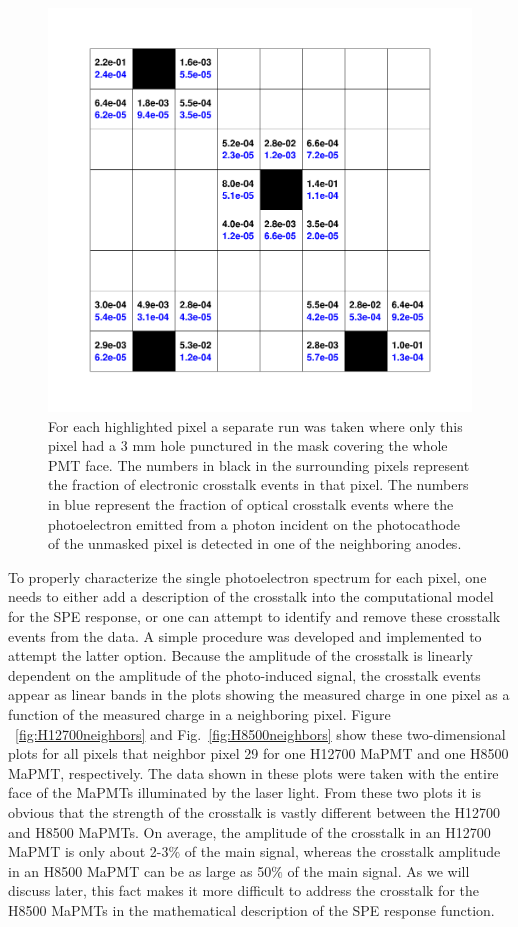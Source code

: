 \begin{figure}
	\centering
	\includegraphics[width=\linewidth]{figures/H12700_ct_ratio_updated.png}
	\caption{For each highlighted pixel a separate run was taken where only this pixel had a 3 mm hole punctured in the mask covering the whole PMT face. The numbers in black in the surrounding pixels represent the fraction of electronic crosstalk events in that pixel. The numbers in blue represent the fraction of optical crosstalk events where the photoelectron emitted from a photon incident on the photocathode of the unmasked pixel is detected in one of the neighboring anodes.}
	\label{fig:H12700_ct_ratio}
\end{figure}

To properly characterize the single photoelectron spectrum for each pixel, one needs to either add a description of the crosstalk into the computational model for the SPE response, or one can attempt to identify and remove these crosstalk events from the data. A simple procedure was developed and implemented to attempt the latter option. Because the amplitude of the crosstalk is linearly dependent on the amplitude of the photo-induced signal, the crosstalk events appear as linear bands in the plots showing the measured charge in one pixel as a function of the measured charge in a neighboring pixel. Figure ~\ref{fig:H12700neighbors} and Fig.~\ref{fig:H8500neighbors} show these two-dimensional plots for all pixels that neighbor pixel 29 for one H12700 MaPMT and one H8500 MaPMT, respectively. The data shown in these plots were taken with the entire face of the MaPMTs illuminated by the laser light. From these two plots it is obvious that the strength of the crosstalk is vastly different between the H12700 and H8500 MaPMTs. On average, the amplitude of the crosstalk in an H12700 MaPMT is only about 2-3$\%$ of the main signal, whereas the crosstalk amplitude in an H8500 MaPMT can be as large as 50$\%$ of the main signal. As we will discuss later, this fact makes it more difficult to address the crosstalk for the H8500 MaPMTs in the mathematical description of the SPE response function.

